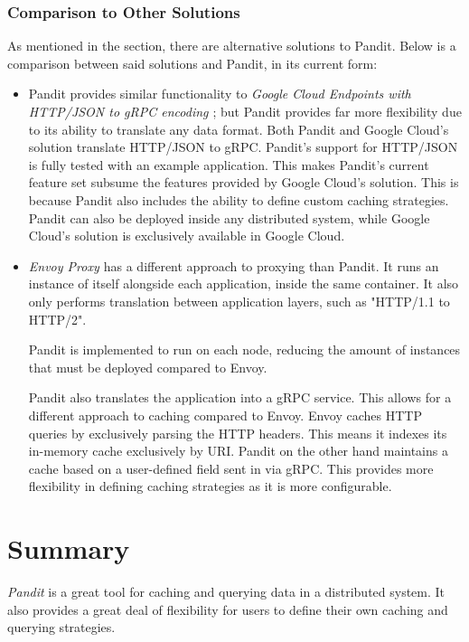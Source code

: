 \documentclass[a4paper,12pt]{report}
\begin{document}
\subsubsection{Comparison to Other Solutions}
\label{sec:comp}
As mentioned in the  section, there are alternative solutions to Pandit.
Below is a comparison between said solutions and Pandit, in its current form:

\begin{itemize}
    \item Pandit provides similar functionality to \textit{Google Cloud Endpoints with HTTP/JSON to gRPC encoding \cite{cloud_endpoints}}; but Pandit provides far more flexibility due to its ability to translate any data format.
    Both Pandit and Google Cloud's solution translate HTTP/JSON to gRPC. Pandit's support for HTTP/JSON is fully tested with an example application.
    This makes Pandit's current feature set subsume the features provided by Google Cloud's solution. 
    This is because Pandit also includes the ability to define custom caching strategies. 
    Pandit can also be deployed inside any distributed system, while Google Cloud's solution is exclusively available in Google Cloud.
    
    \item \textit{Envoy Proxy \cite{envoy}} has a different approach to proxying than Pandit.
    It runs an instance of itself alongside each application, inside the same container.
    It also only performs translation between application layers, such as "HTTP/1.1 to HTTP/2".
    
    Pandit is implemented to run on each node, reducing the amount of instances that must be deployed compared to Envoy.
    
    Pandit also translates the application into a gRPC service. This allows for a different approach to caching compared to Envoy.
    Envoy caches HTTP queries by exclusively parsing the HTTP headers. This means it indexes its in-memory cache exclusively by URI.
    Pandit on the other hand maintains a cache based on a user-defined field sent in via gRPC.
    This provides more flexibility in defining caching strategies as it is more configurable.
\end{itemize}

\section{Summary}
\textit{Pandit} is a great tool for caching and querying data in a distributed system.
It also provides a great deal of flexibility for users to define their own caching and querying strategies.
\end{document}
